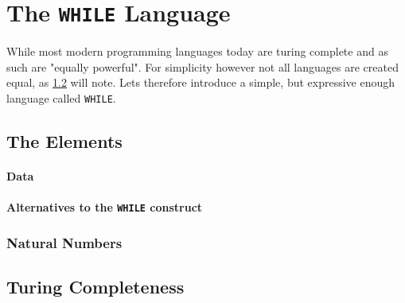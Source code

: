 \section{The {\tt WHILE} Language}
\label{sec:WHILE}
While most modern programming languages today are turing complete and as such 
are "equally powerful". For simplicity however not all languages are created 
equal, as \ref{sub:Turing Completeness} will note. Lets therefore introduce a 
simple, but expressive enough language called {\tt WHILE}.

\subsection{The Elements} %
\label{sub:The Elements}
\paragraph{Data} %
\label{par:Data}


\paragraph{Alternatives to the {\tt WHILE} construct} %
\label{par:Alternatives to the WHILE construct}
\subsubsection{Natural Numbers} %
\label{ssub:Natural Numbers}


\subsection{Turing Completeness} %
\label{sub:Turing Completeness}

